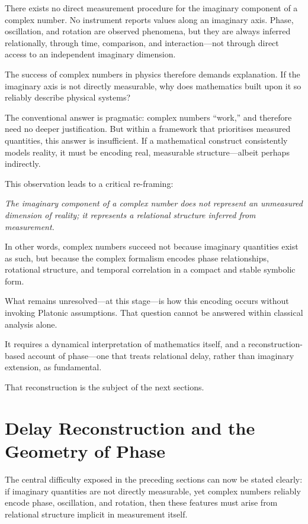 \documentclass[12pt]{book}  %
\begin{document}
There exists no direct measurement procedure for the imaginary component of a complex number. No instrument reports values along an imaginary axis. Phase, oscillation, and rotation are observed phenomena, but they are always inferred relationally, through time, comparison, and interaction—not through direct access to an independent imaginary dimension.

The success of complex numbers in physics therefore demands explanation. If the imaginary axis is not directly measurable, why does mathematics built upon it so reliably describe physical systems?

The conventional answer is pragmatic: complex numbers “work,” and therefore need no deeper justification. But within a framework that prioritises measured quantities, this answer is insufficient. If a mathematical construct consistently models reality, it must be encoding real, measurable structure—albeit perhaps indirectly.

This observation leads to a critical re-framing:

\textit{The imaginary component of a complex number does not represent an unmeasured dimension of reality; it represents a relational structure inferred from measurement.}

In other words, complex numbers succeed not because imaginary quantities exist as such, but because the complex formalism encodes phase relationships, rotational structure, and temporal correlation in a compact and stable symbolic form.

What remains unresolved—at this stage—is how this encoding occurs without invoking Platonic assumptions. That question cannot be answered within classical analysis alone.

It requires a dynamical interpretation of mathematics itself, and a reconstruction-based account of phase—one that treats relational delay, rather than imaginary extension, as fundamental.

That reconstruction is the subject of the next sections.

\chapter{Delay Reconstruction and the Geometry of Phase}

The central difficulty exposed in the preceding sections can now be stated clearly:
if imaginary quantities are not directly measurable, yet complex numbers reliably encode phase, oscillation, and rotation, then these features must arise from relational structure implicit in measurement itself.
\end{document}

